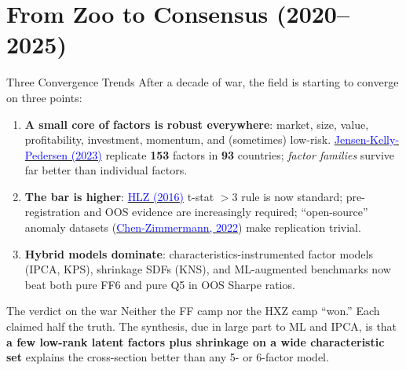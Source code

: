 \documentclass{beamer}
\begin{document}
\section{From Zoo to Consensus (2020--2025)}

\begin{frame}{Three Convergence Trends}
	After a decade of war, the field is starting to converge on three points:
	\begin{enumerate}
		\item \textbf{A small core of factors is robust everywhere}: market, size, value, profitability, investment, momentum, and (sometimes) low-risk. \href{https://doi.org/10.1111/jofi.13249}{\textcolor{blue}{Jensen-Kelly-Pedersen (2023)}} replicate \textbf{153} factors in \textbf{93} countries; \textit{factor families} survive far better than individual factors.
		\item \textbf{The bar is higher}: \href{https://doi.org/10.1093/rfs/hhv059}{\textcolor{blue}{HLZ (2016)}} t-stat $>3$ rule is now standard; pre-registration and OOS evidence are increasingly required; ``open-source'' anomaly datasets (\href{https://doi.org/10.1561/104.00000112}{\textcolor{blue}{Chen-Zimmermann, 2022}}) make replication trivial.
		\item \textbf{Hybrid models dominate}: characteristics-instrumented factor models (IPCA, KPS), shrinkage SDFs (KNS), and ML-augmented benchmarks now beat both pure FF6 and pure Q5 in OOS Sharpe ratios.
	\end{enumerate}
	\vspace{4pt}
	\begin{block}{The verdict on the war}
		Neither the FF camp nor the HXZ camp ``won.'' Each claimed half the truth. The synthesis, due in large part to ML and IPCA, is that \textbf{a few low-rank latent factors plus shrinkage on a wide characteristic set} explains the cross-section better than any 5- or 6-factor model.
	\end{block}
\end{frame}
\end{document}
